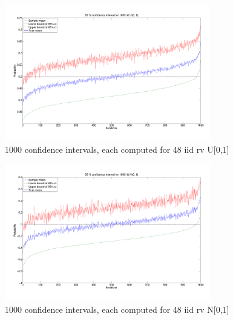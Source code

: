 \documentclass[10pt]{article}
\begin{document}
\begin{figure}[h!]
  \centering
  \includegraphics[width = 0.8\textwidth]{images/hw1_2_c_uni.pdf}
  \caption{1000 confidence intervals, each computed for 48 iid rv U[0,1]}
  \label{fig:ci_mean_1000}
\end{figure}

\clearpage

\begin{figure}[htp!]
  \centering
  \includegraphics[width = 0.8\textwidth]{images/hw1_2_c.pdf}
  \caption{1000 confidence intervals, each computed for 48 iid rv N[0,1]}
  \label{fig:ci_mean_1000_norm}
\end{figure}
\end{document}
